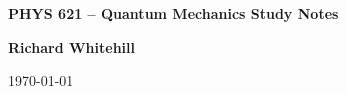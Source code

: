 \begin{titlepage}

    \begin{center}

        \vspace*{1cm}
        \Huge
        \textbf{PHYS 621 -- Quantum Mechanics Study Notes}
        
        \LARGE
        \vfill
        \textbf{Richard Whitehill}
        
        \Large
        \vspace{0.5cm}
        \today


    \end{center}

\end{titlepage}
